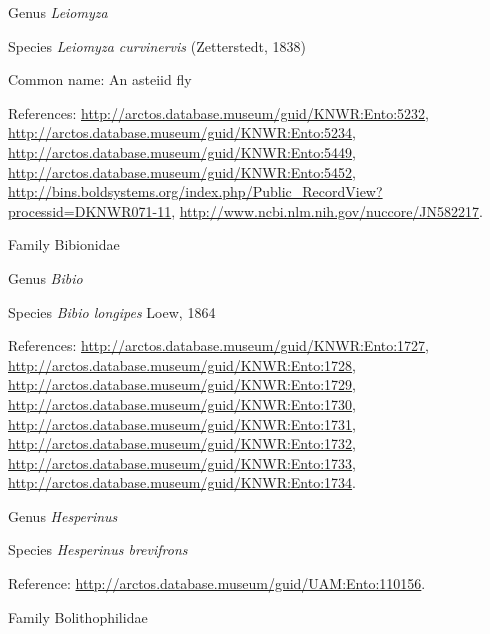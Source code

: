 \documentclass[9pt, article]{memoir}
\begin{document}
\begin{multicols}{2}
\vspace{6pt}\noindent\hspace{30pt}Genus \textit{Leiomyza}


\vspace{6pt}\noindent\hspace{36pt}Species \textit{Leiomyza curvinervis} (Zetterstedt, 1838)


Common name: An asteiid fly

References: 
\url{http://arctos.database.museum/guid/KNWR:Ento:5232}, 
\url{http://arctos.database.museum/guid/KNWR:Ento:5234}, 
\url{http://arctos.database.museum/guid/KNWR:Ento:5449}, 
\url{http://arctos.database.museum/guid/KNWR:Ento:5452}, 
\url{http://bins.boldsystems.org/index.php/Public_RecordView?processid=DKNWR071-11}, 
\url{http://www.ncbi.nlm.nih.gov/nuccore/JN582217}.

\vspace{6pt}\noindent\hspace{24pt}Family Bibionidae


\vspace{6pt}\noindent\hspace{30pt}Genus \textit{Bibio}


\vspace{6pt}\noindent\hspace{36pt}Species \textit{Bibio longipes} Loew, 1864


References: 
\url{http://arctos.database.museum/guid/KNWR:Ento:1727}, 
\url{http://arctos.database.museum/guid/KNWR:Ento:1728}, 
\url{http://arctos.database.museum/guid/KNWR:Ento:1729}, 
\url{http://arctos.database.museum/guid/KNWR:Ento:1730}, 
\url{http://arctos.database.museum/guid/KNWR:Ento:1731}, 
\url{http://arctos.database.museum/guid/KNWR:Ento:1732}, 
\url{http://arctos.database.museum/guid/KNWR:Ento:1733}, 
\url{http://arctos.database.museum/guid/KNWR:Ento:1734}.

\vspace{6pt}\noindent\hspace{30pt}Genus \textit{Hesperinus}


\vspace{6pt}\noindent\hspace{36pt}Species \textit{Hesperinus brevifrons}


Reference: 
\url{http://arctos.database.museum/guid/UAM:Ento:110156}.

\vspace{6pt}\noindent\hspace{24pt}Family Bolithophilidae



\end{multicols}
\end{document}
